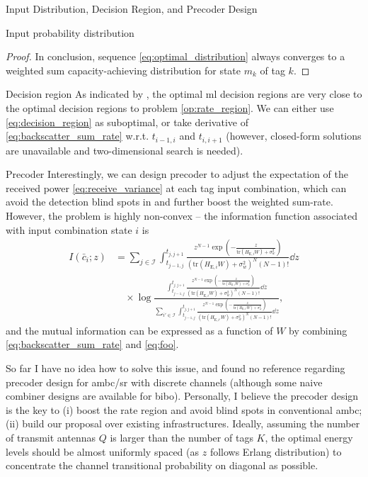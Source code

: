 \documentclass[journal]{IEEEtran}
\begin{document}
\begin{section}{Input Distribution, Decision Region, and Precoder Design}
\begin{subsection}{Input probability distribution}
\begin{proof}
				In conclusion, sequence \eqref{eq:optimal_distribution} always converges to a weighted sum capacity-achieving distribution for state $m_k$ of tag $k$.
			\end{proof}
		\end{subsection}


		\begin{subsection}{Decision region}
			As indicated by \cite{Qian2019b}, the optimal \gls{ml} decision regions are very close to the optimal decision regions to problem \eqref{op:rate_region}. We can either use \eqref{eq:decision_region} as suboptimal, or take derivative of \eqref{eq:backscatter_sum_rate} w.r.t. $t_{i-1,i}$ and $t_{i,i+1}$ (however, closed-form solutions are unavailable and two-dimensional search is needed).
		\end{subsection}

		\begin{subsection}{Precoder}
			Interestingly, we can design precoder to adjust the expectation of the received power \eqref{eq:receive_variance} at each tag input combination, which can avoid the detection blind spots in \cite{Qian2019} and further boost the weighted sum-rate. However, the problem is highly non-convex -- the information function associated with input combination state $i$ is
			\begin{align}
				I(\bar{c}_i;z)
				& = \sum_{j \in \mathcal{I}} \int_{t_{j-1,j}}^{t_{j,j+1}} \frac{z^{N-1} \exp \left(-\frac{z}{\mathrm{tr}(H_{\mathrm{E},i} W) + \sigma_w^2}\right)}{\left(\mathrm{tr}(H_{\mathrm{E},i} W) + \sigma_w^2\right)^N (N-1)!} \dd z\nonumber\\
				& \quad \times \log \frac{\int_{t_{j-1,j}}^{t_{j,j+1}} \frac{z^{N-1} \exp \left(-\frac{z}{\mathrm{tr}(H_{\mathrm{E},i} W) + \sigma_w^2}\right)}{\left(\mathrm{tr}(H_{\mathrm{E},i} W) + \sigma_w^2\right)^N (N-1)!} \dd z}{\sum_{i' \in \mathcal{I}} \int_{t_{j-1,j}}^{t_{j,j+1}} \frac{z^{N-1} \exp \left(-\frac{z}{\mathrm{tr}(H_{\mathrm{E},i'} W) + \sigma_w^2}\right)}{\left(\mathrm{tr}(H_{\mathrm{E},i'} W) + \sigma_w^2\right)^N (N-1)!} \dd z},
				\label{eq:foo}
			\end{align}
			and the mutual information can be expressed as a function of $W$ by combining \eqref{eq:backscatter_sum_rate} and \eqref{eq:foo}.

			So far I have no idea how to solve this issue, and found no reference regarding precoder design for \gls{ambc}/\gls{sr} with discrete channels (although some naive combiner designs are available for \gls{bibo}). Personally, I believe the precoder design is the key to (i) boost the rate region and avoid blind spots in conventional \gls{ambc}; (ii) build our proposal over existing infrastructures. Ideally, assuming the number of transmit antennas $Q$ is larger than the number of tags $K$, the optimal energy levels should be almost uniformly spaced (as $z$ follows Erlang distribution) to concentrate the channel transitional probability on diagonal as possible.
		\end{subsection}
	\end{section}
	
	
\end{document}
